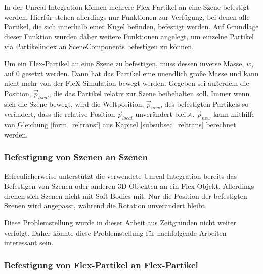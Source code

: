 In der Unreal Integration können mehrere Flex-Partikel an eine Szene befestigt werden. Hierfür stehen allerdings nur Funktionen zur Verfügung, bei denen alle Partikel, die sich innerhalb einer Kugel befinden, befestigt werden. Auf Grundlage dieser Funktion wurden daher weitere Funktionen angelegt, um einzelne Partikel via Partikelindex an SceneComponents befestigen zu können.

Um ein Flex-Partikel an eine Szene zu befestigen, muss dessen inverse Masse, $w$, auf 0 gesetzt werden. Dann hat das Partikel eine unendlich große Masse und kann nicht mehr von der FleX Simulation bewegt werden. 
Gegeben sei außerdem die Position, $\vec{p}_{local}$, die das Partikel relativ zur Szene beibehalten soll. Immer wenn sich die Szene bewegt, wird die Weltposition, $\vec{p}_{new}$, des befestigten Partikels so verändert, dass die relative Position $\vec{p}_{local}$ unverändert bleibt.
$\vec{p}_{new}$ kann mithilfe von Gleichung \ref{form_reltransf} aus Kapitel \ref{subsubsec_reltrans} berechnet werden.




\subsubsection{Befestigung von Szenen an Szenen}

Erfreulicherweise unterstützt die verwendete Unreal Integration bereits das Befestigen von Szenen oder anderen 3D Objekten an ein Flex-Objekt. Allerdings drehen sich Szenen nicht mit Soft Bodies mit. Nur die Position der befestigten Szenen wird angepasst, während die Rotation unverändert bleibt. 


Diese Problemstellung wurde in dieser Arbeit aus Zeitgründen nicht weiter verfolgt. Daher könnte diese Problemstellung für nachfolgende Arbeiten interessant sein.

\subsubsection{Befestigung von Flex-Partikel an Flex-Partikel}

